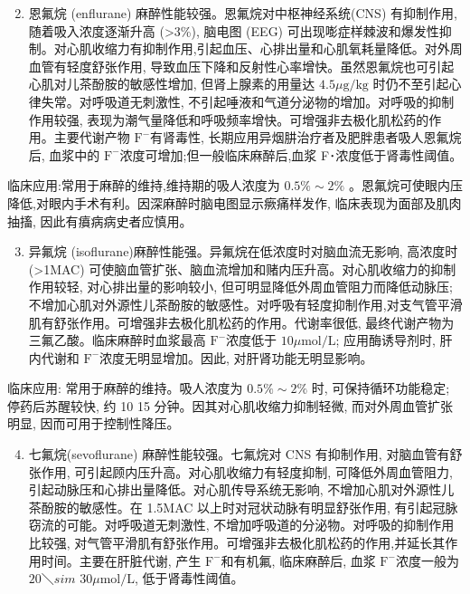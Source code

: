 \documentclass[10pt]{article}
\begin{document}
\begin{enumerate}
  \setcounter{enumi}{1}
  \item 恩氟烷 (enflurane) 麻醉性能较强。恩氟烷对中枢神经系统(CNS) 有抑制作用, 随着吸入浓度逐渐升高 (>3\%), 脑电图 (EEG) 可出现嘭症样棘波和爆发性抑制。对心肌收缩力有抑制作用,引起血压、心排出量和心肌氧耗量降低。对外周血管有轻度舒张作用, 导致血压下降和反射性心率增快。虽然恩氟烷也可引起心肌对儿茶酚胺的敏感性增加, 但肾上腺素的用量达 $4.5 \mu \mathrm{g} / \mathrm{kg}$ 时仍不至引起心律失常。对呼吸道无刺激性, 不引起唾液和气道分泌物的增加。对呼吸的抑制作用较强, 表现为潮气量降低和呼吸频率增快。可增强非去极化肌松药的作用。主要代谢产物 $\mathrm{F}^{-}$有肾毒性, 长期应用异烟肼治疗者及肥胖患者吸人恩氟烷后, 血浆中的 $\mathrm{F}^{-}$浓度可增加;但一般临床麻醉后,血浆 F･浓度低于肾毒性阈值。
\end{enumerate}

临床应用:常用于麻醉的维持,维持期的吸人浓度为 $0.5 \% \sim 2 \%$ 。恩氟烷可使眼内压降低,对眼内手术有利。因深麻醉时脑电图显示瘚痛样发作, 临床表现为面部及肌肉抽搐, 因此有㿎病病史者应慎用。

\begin{enumerate}
  \setcounter{enumi}{2}
  \item 异氟烷 (isoflurane)麻醉性能强。异氟烷在低浓度时对脑血流无影响, 高浓度时 (>1MAC) 可使脑血管扩张、脑血流增加和赌内压升高。对心肌收缩力的抑制作用较轻, 对心排出量的影响较小, 但可明显降低外周血管阻力而降低动脉压; 不增加心肌对外源性儿茶酚胺的敏感性。对呼吸有轻度抑制作用,对支气管平滑肌有舒张作用。可增强非去极化肌松药的作用。代谢率很低, 最终代谢产物为三氟乙酸。临床麻醉时血浆最高 $\mathrm{F}^{-}$浓度低于 $10 \mu \mathrm{mol} / \mathrm{L}$; 应用酶诱导剂时, 肝内代谢和 $\mathrm{F}^{-}$浓度无明显增加。因此, 对肝肾功能无明显影响。
\end{enumerate}

临床应用: 常用于麻醉的维持。吸人浓度为 $0.5 \% \sim 2 \%$ 时, 可保持循环功能稳定; 停药后苏醒较快, 约 10 15 分钟。因其对心肌收缩力抑制轻微, 而对外周血管扩张明显, 因而可用于控制性降压。

\begin{enumerate}
  \setcounter{enumi}{3}
  \item 七氟烷(sevoflurane) 麻醉性能较强。七氟烷对 CNS 有抑制作用, 对脑血管有舒张作用, 可引起顾内压升高。对心肌收缩力有轻度抑制, 可降低外周血管阻力, 引起动脉压和心排出量降低。对心肌传导系统无影响, 不增加心肌对外源性儿茶酚胺的敏感性。在 1.5MAC 以上时对冠状动脉有明显舒张作用, 有引起冠脉窃流的可能。对呼吸道无刺激性, 不增加呼吸道的分泌物。对呼吸的抑制作用比较强, 对气管平滑肌有舒张作用。可增强非去极化肌松药的作用,并延长其作用时间。主要在肝脏代谢, 产生 $\mathrm{F}^{-}$和有机氟, 临床麻醉后, 血浆 $\mathrm{F}^{-}$浓度一般为 $20 ＼sim$ $30 \mu \mathrm{mol} / \mathrm{L}$, 低于肾毒性阈值。
\end{enumerate}
\end{document}
